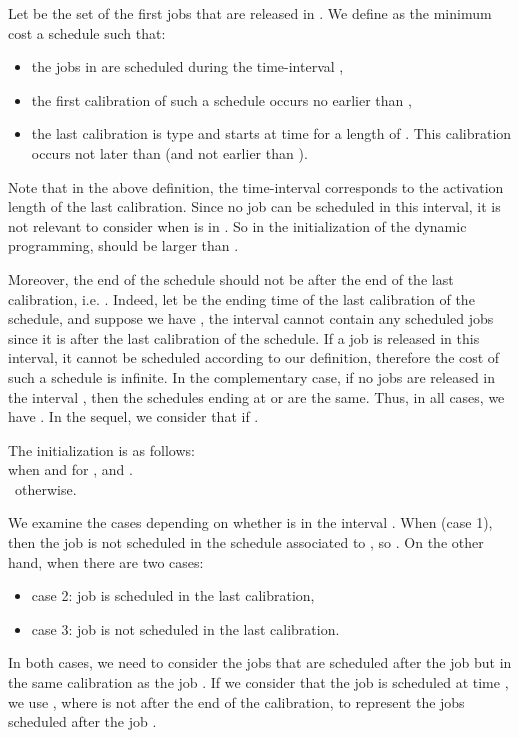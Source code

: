 \begin{definition} Let  be the set of the  first jobs that are released in .
We define  as the minimum cost a schedule such that:
\begin{itemize}
\item the jobs in  are scheduled during the time-interval ,
\item the first calibration of such a schedule occurs no earlier than ,
\item the last calibration is type  and starts at time  for a length of . This calibration occurs not later than  (and not earlier than ).
\end{itemize}
\end{definition}

Note that in the above definition, the time-interval  corresponds to the activation length of the last calibration. Since no job can be scheduled in this interval, it is not relevant to consider when  is in . So in the initialization of the dynamic programming,  should be larger than .

Moreover, the end of the schedule should not be after the end of the last calibration, i.e. . Indeed, let  be the ending time of the last calibration of the schedule, and suppose we have , the interval  cannot contain any scheduled jobs since it is after the last calibration of the schedule. If a job is released in this interval, it cannot be scheduled according to our definition, therefore the cost of such a schedule is infinite. In the complementary case, if no jobs are released in the interval , then the schedules ending at  or  are the same. Thus, in all cases, we have .
In the sequel, we consider that  if .

The initialization is as follows:\\
 when  and  for ,  and .\\
~otherwise.





We examine the cases depending on whether  is in the interval .
When  (case 1), then the job  is not scheduled in the schedule associated to , so .
On the other hand, when  there are two cases: 
\begin{itemize}
\item case 2: job  is scheduled in the last calibration,
\item case 3: job  is not scheduled in the last calibration.
\end{itemize}
In both cases, we need to consider the jobs that are scheduled after the job  but in the same calibration as the job . If we consider that the job  is scheduled at time , we use , where  is not after the end of the calibration, to represent the jobs scheduled after the job .


